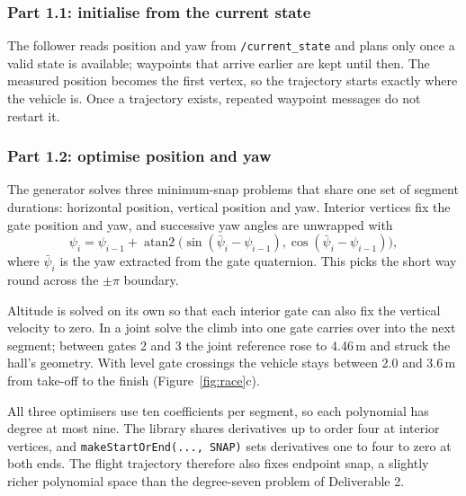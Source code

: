 \documentclass[12pt,a4paper,twoside]{article}
\begin{document}
\subsubsection{Part 1.1: initialise from the current state}
The follower reads position and yaw from \texttt{/current\_state} and plans only
once a valid state is available; waypoints that arrive earlier are kept until
then. The measured position becomes the first vertex, so the trajectory starts
exactly where the vehicle is. Once a trajectory exists, repeated waypoint
messages do not restart it.

\subsubsection{Part 1.2: optimise position and yaw}
The generator solves three minimum-snap problems that share one set of segment
durations: horizontal position, vertical position and yaw. Interior vertices fix
the gate position and yaw, and successive yaw angles are unwrapped with
\begin{equation}
\psi_i=\psi_{i-1}+\operatorname{atan2}
\bigl(\sin(\bar\psi_i-\psi_{i-1}),\cos(\bar\psi_i-\psi_{i-1})\bigr),
\end{equation}
where $\bar\psi_i$ is the yaw extracted from the gate quaternion. This picks the
short way round across the $\pm\pi$ boundary.

Altitude is solved on its own so that each interior gate can also fix the
vertical velocity to zero. In a joint solve the climb into one gate carries over
into the next segment; between gates 2 and 3 the joint reference rose to 4.46\,m
and struck the hall's geometry. With level gate crossings the vehicle stays between
2.0 and 3.6\,m from take-off to the finish (Figure~\ref{fig:race}c).

All three optimisers use ten coefficients per segment, so each polynomial has
degree at most nine. The library shares derivatives up to order four at interior
vertices, and \texttt{makeStartOrEnd(..., SNAP)} sets derivatives one to four to
zero at both ends. The flight trajectory therefore also fixes endpoint snap, a
slightly richer polynomial space than the degree-seven problem of Deliverable 2.
\end{document}
